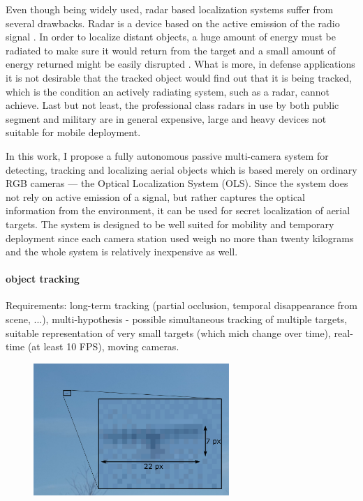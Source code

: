Even though being widely used, radar based localization systems suffer from several drawbacks. Radar is a device based on the active emission of the radio signal \cite{toomay2012radar}. In order to localize distant objects, a huge amount of energy must be radiated to make sure it would return from the target and a small amount of energy returned might be easily disrupted \cite{Airtrafficmuseum}. What is more, in defense applications it is not desirable that the tracked object would find out that it is being tracked, which is the condition an actively radiating system, such as a radar, cannot achieve. Last but not least, the professional class radars in use by both public segment and military are in general expensive, large and heavy devices not suitable for mobile deployment.

In this work, I propose a fully autonomous passive multi-camera system for detecting, tracking and localizing aerial objects which is based merely on ordinary RGB cameras --- the Optical Localization System (OLS). Since the system does not rely on active emission of a signal, but rather captures the optical information from the environment, it can be used for secret localization of aerial targets. The system is designed to be well suited for mobility and temporary deployment since each camera station used weigh no more than twenty kilograms and the whole system is relatively inexpensive as well.

\paragraph{object tracking}
Requirements: long-term tracking (partial occlusion, temporal disappearance from scene, ...), multi-hypothesis - possible simultaneous tracking of multiple targets, suitable representation of very small targets (which mich change over time), real-time (at least 10 FPS), moving cameras.

\begin{figure}[t]\centering %
	\centering
	\includegraphics[width=0.45\linewidth, height=5cm]{fig/small_tracked_object.png}
	\caption{}
	\label{fig:small_tracked_object}
\end{figure}


